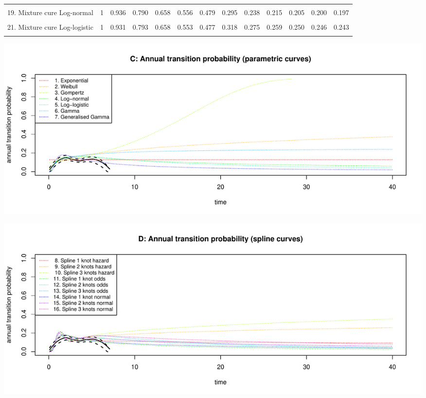 \documentclass[]{article}
\begin{document}
\begin{table}
{\begin{tabular}[t]{lrrrrrrrrrrrr}
\cellcolor{gray!6}{18. Non-mixture cure Weibull} & \cellcolor{gray!6}{1} & \cellcolor{gray!6}{0.929} & \cellcolor{gray!6}{0.801} & \cellcolor{gray!6}{0.670} & \cellcolor{gray!6}{0.559} & \cellcolor{gray!6}{0.475} & \cellcolor{gray!6}{0.314} & \cellcolor{gray!6}{0.297} & \cellcolor{gray!6}{0.296} & \cellcolor{gray!6}{0.296} & \cellcolor{gray!6}{0.296} & \cellcolor{gray!6}{0.296}\\
19. Mixture cure Log-normal & 1 & 0.936 & 0.790 & 0.658 & 0.556 & 0.479 & 0.295 & 0.238 & 0.215 & 0.205 & 0.200 & 0.197\\
\cellcolor{gray!6}{20. Non-mixture cure Log-normal} & \cellcolor{gray!6}{1} & \cellcolor{gray!6}{0.937} & \cellcolor{gray!6}{0.787} & \cellcolor{gray!6}{0.654} & \cellcolor{gray!6}{0.555} & \cellcolor{gray!6}{0.482} & \cellcolor{gray!6}{0.315} & \cellcolor{gray!6}{0.261} & \cellcolor{gray!6}{0.237} & \cellcolor{gray!6}{0.225} & \cellcolor{gray!6}{0.218} & \cellcolor{gray!6}{0.214}\\
21. Mixture cure Log-logistic & 1 & 0.931 & 0.793 & 0.658 & 0.553 & 0.477 & 0.318 & 0.275 & 0.259 & 0.250 & 0.246 & 0.243\\
\cellcolor{gray!6}{22. Non-mixture cure Log-logistic} & \cellcolor{gray!6}{1} & \cellcolor{gray!6}{0.931} & \cellcolor{gray!6}{0.793} & \cellcolor{gray!6}{0.659} & \cellcolor{gray!6}{0.554} & \cellcolor{gray!6}{0.479} & \cellcolor{gray!6}{0.327} & \cellcolor{gray!6}{0.287} & \cellcolor{gray!6}{0.272} & \cellcolor{gray!6}{0.265} & \cellcolor{gray!6}{0.261} & \cellcolor{gray!6}{0.258}\\
\bottomrule
\end{tabular}}
\end{table}

\begin{flushleft}\includegraphics[height=0.29\textheight]{Images/validate_extrapolation2-3} \end{flushleft}

\begin{flushleft}\includegraphics[height=0.29\textheight]{Images/validate_extrapolation2-4} \end{flushleft}
\end{document}
